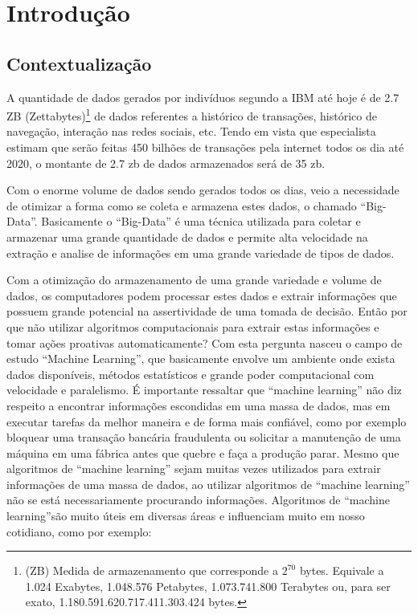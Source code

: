 \chapter{Introdução}
\label{cap:introducao}

\section{Contextualização}
\label{sec:contextualizacao}
	A quantidade de dados gerados por indivíduos segundo a IBM até hoje é de 2.7 ZB (Zettabytes)\footnote{(ZB) Medida de armazenamento que corresponde a $2^{70}$ bytes. Equivale a 1.024 Exabytes,
1.048.576 Petabytes, 1.073.741.800 Terabytes ou, para ser exato, 1.180.591.620.717.411.303.424 bytes.} de dados referentes a histórico de transações, histórico de navegação, interação nas redes sociais, etc. Tendo em vista que especialista estimam que serão feitas 450 bilhões de transações pela internet todos os dia até 2020, o montante de 2.7 zb de dados armazenados será de 35 zb.

	Com o enorme volume de dados sendo gerados todos os dias, veio a necessidade de otimizar a forma como se coleta e armazena estes dados, o chamado “Big-Data”. Basicamente o “Big-Data” é uma técnica utilizada para coletar e armazenar uma grande quantidade de dados e permite alta velocidade na extração e analise de informações em uma grande variedade de tipos de dados. 

	Com a otimização do armazenamento de uma grande variedade e volume de dados, os computadores podem processar estes dados e extrair informações que possuem grande potencial na assertividade de uma tomada de decisão. Então por que não utilizar algoritmos computacionais para extrair estas informações e tomar ações proativas automaticamente? Com esta pergunta nasceu o campo de estudo “Machine Learning”, que basicamente envolve um ambiente onde exista dados disponíveis, métodos estatísticos e grande poder computacional com velocidade e paralelismo. 
	É importante ressaltar que “machine learning” não diz respeito a encontrar informações escondidas em uma massa de dados, mas em executar tarefas da melhor maneira e de forma mais confiável, como por exemplo bloquear uma transação bancária fraudulenta ou solicitar a manutenção de uma máquina em uma fábrica antes que quebre e faça a produção parar. Mesmo que algoritmos de “machine learning” sejam muitas vezes utilizados para extrair informações de uma massa de dados, ao utilizar algoritmos de “machine learning” não se está necessariamente procurando informações. Algoritmos de “machine learning”são muito úteis em diversas áreas e influenciam muito em nosso cotidiano, como por exemplo:

